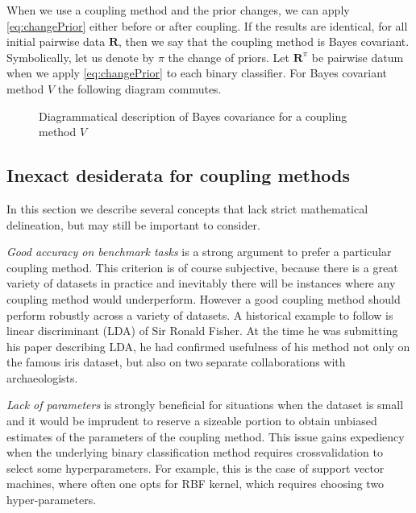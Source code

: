 \documentclass[twoside,11pt]{article}
\begin{document}
When we use a coupling method and the prior changes, we  can apply \eqref{eq:changePrior} either before or after coupling. If the results are identical, for all initial pairwise data $\boldsymbol{R}$, then we say that the coupling method is Bayes covariant. Symbolically, let us denote by  $\pi$ the change of priors. Let $\boldsymbol{R}^\pi$ be pairwise datum when we apply \eqref{eq:changePrior} to each binary classifier.
For Bayes covariant method $V$ the following diagram commutes.

\begin{figure}[!h]
\centering
{}
\caption{Diagrammatical description of Bayes covariance for a coupling method $V$}
\label{fig:bc}
\end{figure}


\subsection{Inexact desiderata for coupling methods}

\label{sec:des:inexact}

In this section we describe several concepts that lack strict mathematical delineation, but may still be important to consider.

\emph{Good accuracy on benchmark tasks} is  a strong argument to prefer a particular coupling method. This criterion is of course subjective, because there is a great variety of datasets in practice and inevitably there will be instances where any coupling method would underperform. However a good coupling method should perform robustly across a variety of datasets. A historical  example to follow is linear discriminant (LDA) of  Sir Ronald Fisher. At the time he was submitting his paper describing LDA, he had confirmed usefulness of his method not only on the famous iris dataset, but also on two separate collaborations with archaeologists. 

\emph{Lack of parameters} is strongly beneficial for situations when the dataset is small and it would be imprudent to reserve a sizeable portion to obtain unbiased estimates of the parameters of the coupling method. This issue gains expediency when the underlying binary classification method requires crossvalidation to select some hyperparameters. For example, this is the case of support vector machines, where often one opts for RBF kernel, which requires choosing two hyper-parameters. 
\end{document}
